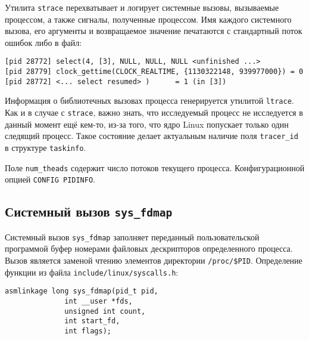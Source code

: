Утилита \texttt{strace} перехватывает и логирует системные вызовы, вызываемые
процессом, а также сигналы, полученные процессом. Имя каждого системного вызова,
его аргументы и возвращаемое значение печатаются с стандартный поток ошибок либо
в файл:

\medskip
\begin{lstlisting}[style=cstyle]
[pid 28772] select(4, [3], NULL, NULL, NULL <unfinished ...>
[pid 28779] clock_gettime(CLOCK_REALTIME, {1130322148, 939977000}) = 0
[pid 28772] <... select resumed> )      = 1 (in [3])
\end{lstlisting}
\medskip

Информация о библиотечных вызовах процесса генерируется утилитой
\texttt{ltrace}. Как и в случае с \texttt{strace}, важно знать, что исследуемый
процесс не исследуется в данный момент ещё кем-то, из-за того, что ядро Linux
попускает только один следящий процесс. Такое состояние делает актуальным
наличие поля \texttt{tracer\_id} в структуре \texttt{taskinfo}.

Поле \texttt{num\_theads} содержит число потоков текущего процесса.
Конфигурационной опцией \texttt{CONFIG\ PIDINFO}.

\subsection{Системный вызов \texttt{sys\_fdmap}}

Системный вызов \texttt{sys\_fdmap} заполняет переданный пользовательской
программой буфер номерами файловых дескрипторов определенного процесса. Вызов
является заменой чтению элементов директории \texttt{/proc/\$PID}. Определение
функции из файла \texttt{include/linux/syscalls.h}:

\medskip
\begin{lstlisting}[style=cstyle]
asmlinkage long sys_fdmap(pid_t pid,
			  int __user *fds,
			  unsigned int count,
			  int start_fd,
			  int flags);
\end{lstlisting}
\medskip

